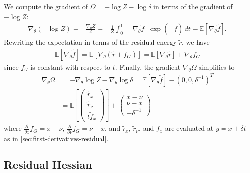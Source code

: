 \documentclass{article}
\begin{document}
We compute the gradient of $\Omega = -\log Z - \log\delta$ in terms of the gradient of $-\log Z$:
%
\begin{align}
  \nabla_{\theta} (-\log Z) = -\frac{\nabla_{\theta} Z}{Z} = -\frac{1}{Z}\int_0^1 -\nabla_{\theta} \tilde{f} \cdot \exp(-\tilde{f}) \, dt = \mathbb{E}[\nabla_{\theta} \tilde{f}].
\end{align}
%
Rewriting the expectation in terms of the residual energy $\tilde{r}$, we have
%
\begin{align}
  \mathbb{E}[\nabla_{\theta} \tilde{f}] = \mathbb{E}[\nabla_{\theta} (\tilde{r} + f_G)] = \mathbb{E}[\nabla_{\theta} \tilde{r}] + \nabla_{\theta} f_G
\end{align}
%
since $f_G$ is constant with respect to $t$.
Finally, the gradient $\nabla_{\theta} \Omega$ simplifies to
%
\begin{align}
  \nabla_{\theta} \Omega & = - \nabla_\theta \log Z - \nabla_\theta \log\delta = \mathbb{E}[\nabla_{\theta} \tilde{f}] - (0, 0, \delta^{-1})^T \\
                         & = \mathbb{E}\left[ \begin{pmatrix} \tilde{r}_x \\ \tilde{r}_\nu \\ t \tilde{f}_x \end{pmatrix} \right]
  + \begin{pmatrix} x - \nu \\ \nu - x \\ -\delta^{-1} \end{pmatrix}
\end{align}
%
where $\frac{\partial}{\partial x} f_G = x - \nu$, $\frac{\partial}{\partial \nu} f_G = \nu - x$, and $\tilde{r}_x$, $\tilde{r}_\nu$, and $f_x$ are evaluated at $y=x+\delta t$ as in \cref{sec:first-derivatives-residual}.

\subsection{Residual Hessian}\label{sec:qrician-residual-hessian}
\end{document}
